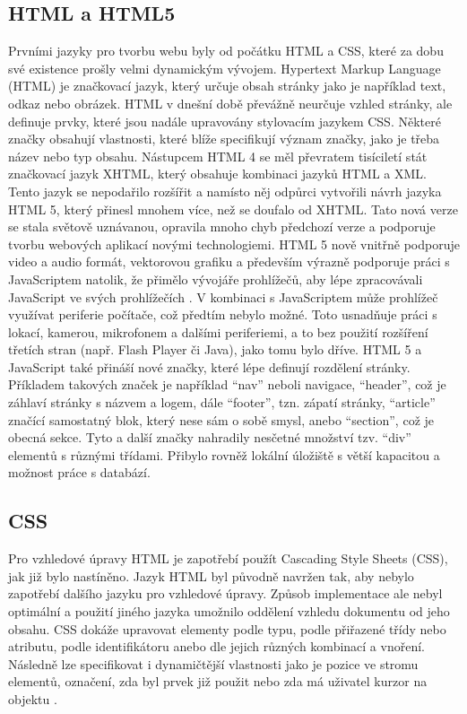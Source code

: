         \subsection{HTML a HTML5}
Prvními jazyky pro tvorbu webu byly od počátku HTML a CSS, které za dobu své existence prošly velmi dynamickým vývojem. Hypertext Markup Language (HTML) je značkovací jazyk, který určuje obsah stránky jako je například text, odkaz nebo obrázek. HTML v dnešní době převážně neurčuje vzhled stránky, ale definuje prvky, které jsou nadále upravovány stylovacím jazykem CSS. Některé značky obsahují vlastnosti, které blíže specifikují význam značky, jako je třeba název nebo typ obsahu. Nástupcem HTML 4 se měl převratem tisíciletí stát značkovací jazyk XHTML, který obsahuje kombinaci jazyků HTML a XML. Tento jazyk se nepodařilo rozšířit a namísto něj odpůrci vytvořili návrh jazyka HTML 5, který přinesl mnohem více, než se doufalo od XHTML. Tato nová verze se stala světově uznávanou, opravila mnoho chyb předchozí verze a podporuje tvorbu webových aplikací novými technologiemi. HTML 5 nově vnitřně podporuje video a audio formát, vektorovou grafiku a především výrazně podporuje práci s JavaScriptem natolik, že přimělo vývojáře prohlížečů, aby lépe zpracovávali JavaScript ve svých prohlížečích \cite{spadevelopment}. V kombinaci s JavaScriptem může prohlížeč využívat periferie počítače, což předtím nebylo možné. Toto usnadňuje práci s lokací, kamerou, mikrofonem a dalšími periferiemi, a to bez použití rozšíření třetích stran (např. Flash Player či Java), jako tomu bylo dříve. HTML 5 a JavaScript také přináší nové značky, které lépe definují rozdělení stránky. Příkladem takových značek je například “nav” neboli navigace, “header”, což je záhlaví stránky s názvem a logem, dále “footer”, tzn. zápatí stránky, “article” značící samostatný blok, který nese sám o sobě smysl, anebo “section”, což je obecná sekce. Tyto a další značky nahradily nesčetné množství tzv. “div” elementů s různými třídami. Přibylo rovněž lokální úložiště s větší kapacitou a možnost práce s databází.

        \subsection{CSS}
Pro vzhledové úpravy HTML je zapotřebí použít Cascading Style Sheets (CSS), jak již bylo nastíněno. Jazyk HTML byl původně navržen tak, aby nebylo zapotřebí dalšího jazyku pro vzhledové úpravy. Způsob implementace ale nebyl optimální a použití jiného jazyka umožnilo oddělení vzhledu dokumentu od jeho obsahu. CSS dokáže upravovat elementy podle typu, podle přiřazené třídy nebo atributu, podle identifikátoru anebo dle jejich různých kombinací a vnoření. Následně lze specifikovat i dynamičtější vlastnosti jako je pozice ve stromu elementů, označení, zda byl prvek již použit nebo zda má uživatel kurzor na objektu \cite{eloquentjava}.

